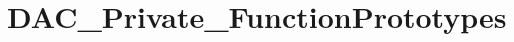 \hypertarget{group___d_a_c___private___function_prototypes}{}\section{D\+A\+C\+\_\+\+Private\+\_\+\+Function\+Prototypes}
\label{group___d_a_c___private___function_prototypes}
